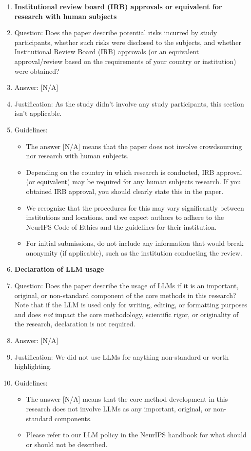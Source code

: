 \documentclass{llmxive}
\providecommand{\answerNA}[1][]{[N/A]#1}
\begin{document}
\begin{enumerate}
\item {\bf Institutional review board (IRB) approvals or equivalent for research with human subjects}
    \item[] Question: Does the paper describe potential risks incurred by study participants, whether such risks were disclosed to the subjects, and whether Institutional Review Board (IRB) approvals (or an equivalent approval/review based on the requirements of your country or institution) were obtained?
    \item[] Answer: \answerNA{}
    \item[] Justification: As the study didn’t involve any study participants, this section isn’t applicable.
    \item[] Guidelines:
    \begin{itemize}
        \item The answer \answerNA{} means that the paper does not involve crowdsourcing nor research with human subjects.
        \item Depending on the country in which research is conducted, IRB approval (or equivalent) may be required for any human subjects research. If you obtained IRB approval, you should clearly state this in the paper. 
        \item We recognize that the procedures for this may vary significantly between institutions and locations, and we expect authors to adhere to the NeurIPS Code of Ethics and the guidelines for their institution. 
        \item For initial submissions, do not include any information that would break anonymity (if applicable), such as the institution conducting the review.
    \end{itemize}

\item {\bf Declaration of LLM usage}
    \item[] Question: Does the paper describe the usage of LLMs if it is an important, original, or non-standard component of the core methods in this research? Note that if the LLM is used only for writing, editing, or formatting purposes and does \emph{not} impact the core methodology, scientific rigor, or originality of the research, declaration is not required.
    \item[] Answer: \answerNA{}
    \item[] Justification: We did not use LLMs for anything non-standard or worth highlighting.
    \item[] Guidelines:
    \begin{itemize}
        \item The answer \answerNA{} means that the core method development in this research does not involve LLMs as any important, original, or non-standard components.
        \item Please refer to our LLM policy in the NeurIPS handbook for what should or should not be described.
    \end{itemize}

\end{enumerate}
\end{document}
